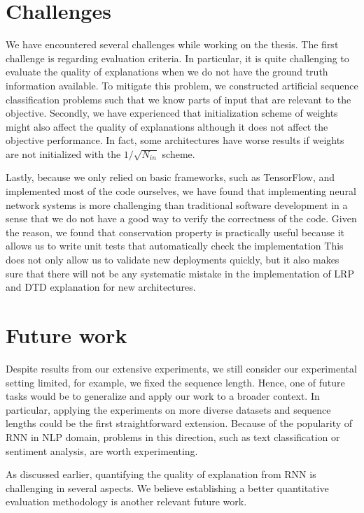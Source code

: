 \section{Challenges}
We have encountered several challenges while working on the thesis. The first challenge is regarding evaluation criteria. In particular, it is quite challenging to evaluate the quality of explanations when we do not have the ground truth information available. To mitigate this problem, we constructed artificial sequence classification problems such that we know parts of input that are relevant to the objective.  Secondly, we have experienced that initialization scheme of weights might also affect the quality of explanations although it does not affect the objective performance. In fact, some architectures have worse results if weights are not initialized with the $1/\sqrt{N_{in}}$ scheme.

Lastly, because we only relied on basic frameworks, such as TensorFlow, and implemented most of the code ourselves, we have found that implementing neural network systems is more challenging than traditional software development in a sense that we do not have a good way to verify the correctness of the code. Given the reason, we found that conservation property is practically useful because it allows us to write unit tests that automatically check the implementation This does not only allow us to validate new deployments quickly, but it also makes sure that there will not be any systematic mistake in the implementation of LRP and DTD explanation for new architectures.


\section{Future work}
Despite results from our extensive experiments, we still consider our experimental setting limited, for example, we fixed the sequence length.  Hence, one of future tasks would be to generalize and apply our work to a broader context. In particular,  applying the experiments on more diverse datasets and sequence lengths could be the first straightforward extension. Because of the popularity of RNN in NLP domain, problems in this direction, such as text classification or sentiment analysis, are worth experimenting. 

As discussed earlier, quantifying the quality of explanation from RNN is challenging in several aspects. We believe establishing a better quantitative evaluation methodology is another relevant future work.

